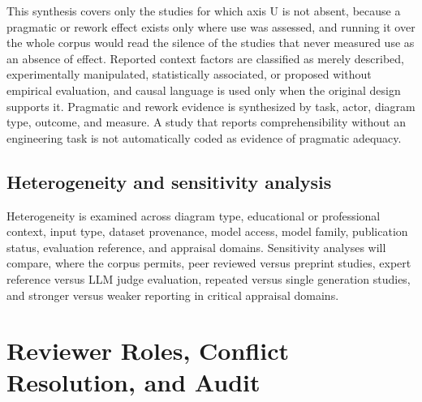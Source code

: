 This synthesis covers only the studies for which axis U is not absent, because a pragmatic or rework effect exists only where use was assessed, and running it over the whole corpus would read the silence of the studies that never measured use as an absence of effect. Reported context factors are classified as merely described, experimentally manipulated, statistically associated, or proposed without empirical evaluation, and causal language is used only when the original design supports it. Pragmatic and rework evidence is synthesized by task, actor, diagram type, outcome, and measure. A study that reports comprehensibility without an engineering task is not automatically coded as evidence of pragmatic adequacy.

\subsection{Heterogeneity and sensitivity analysis}

Heterogeneity is examined across diagram type, educational or professional context, input type, dataset provenance, model access, model family, publication status, evaluation reference, and appraisal domains. Sensitivity analyses will compare, where the corpus permits, peer reviewed versus preprint studies, expert reference versus LLM judge evaluation, repeated versus single generation studies, and stronger versus weaker reporting in critical appraisal domains.

\section{Reviewer Roles, Conflict Resolution, and Audit}
\label{sec:protocol_reviewers}

